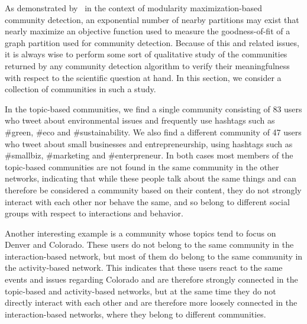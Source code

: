 As demonstrated by~\cite{good2010performance} in the context of modularity maximization-based community detection, an exponential number of nearby partitions may exist that nearly maximize an objective function used to measure the goodness-of-fit of a graph partition used for community detection. Because of this and related issues, it is always wise to perform some sort of qualitative study of the communities returned by any  community detection algorithm to verify their meaningfulness with respect to the scientific question at hand. In this section, we consider a collection of communities in such a study. 

In the topic-based communities, we find a single community consisting of 83 users who tweet about environmental issues and frequently use hashtags such as \#green, \#eco and \#sustainability. We also find a different community of 47 users who tweet about small businesses and entrepreneurship, using hashtags such as \#smallbiz, \#marketing and \#enterpreneur. In both cases most members of the topic-based communities are not found in the same community in the other networks, indicating that while these people talk about the same things and can therefore be considered a community based on their content, they do not strongly interact with each other nor behave the same, and so belong to different social groups with respect to interactions and behavior.

Another interesting example is a community whose topics tend to focus on Denver and Colorado. These users do not belong to the same community in the interaction-based network, but most of them do belong to the same community in the activity-based network. This indicates that these users react to the same events and issues regarding Colorado and are therefore strongly connected in the topic-based and activity-based networks, but at the same time they do not directly interact with each other and are therefore more loosely connected in the interaction-based networks, where they belong to different communities. 



